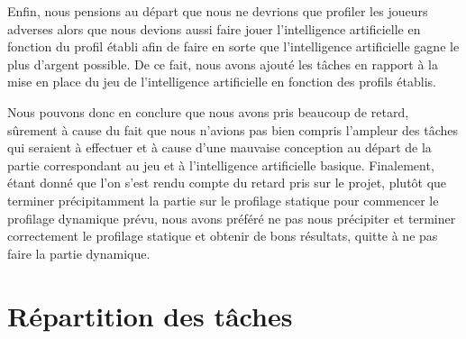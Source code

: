 \documentclass{report}
\begin{document}
Enfin, nous pensions au départ que nous ne devrions que profiler les joueurs adverses alors que nous devions aussi faire jouer l'intelligence artificielle en fonction du profil établi afin de faire en sorte que l'intelligence artificielle gagne le plus d'argent possible. De ce fait, nous avons ajouté les tâches en rapport à la mise en place du jeu de l'intelligence artificielle en fonction des profils établis. \par

Nous pouvons donc en conclure que nous avons pris beaucoup de retard, sûrement à cause du fait que nous n'avions pas bien compris l'ampleur des tâches qui seraient à effectuer et à cause d'une mauvaise conception au départ de la partie correspondant au jeu et à l'intelligence artificielle basique. Finalement, étant donné que l'on s'est rendu compte du retard pris sur le projet, plutôt que terminer précipitamment la partie sur le profilage statique pour commencer le profilage dynamique prévu, nous avons préféré ne pas nous précipiter et terminer correctement le profilage statique et obtenir de bons résultats, quitte à ne pas faire la partie dynamique. \par


\section{Répartition des tâches}
\end{document}
